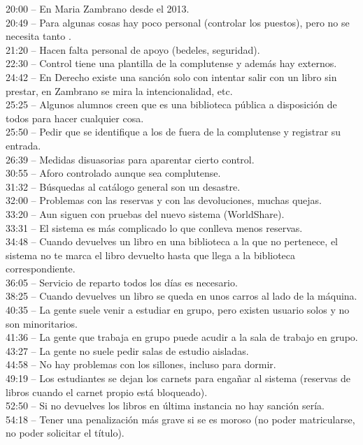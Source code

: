 \documentclass[12pt]{article}
\begin{document}
20:00 – En Maria Zambrano desde el 2013.\\
20:49 – Para algunas cosas hay poco personal (controlar los puestos), pero no se necesita tanto .\\
21:20 – Hacen falta personal de apoyo (bedeles, seguridad).\\
22:30 – Control tiene una plantilla de la complutense y además hay externos.\\
24:42 – En Derecho existe una sanción solo con intentar salir con un libro sin prestar, en Zambrano se mira la intencionalidad, etc.\\
25:25 – Algunos alumnos creen que es una biblioteca pública a disposición de todos para hacer cualquier cosa.\\
25:50 – Pedir que se identifique a los de fuera de la complutense y registrar su entrada.\\
26:39 – Medidas disuasorias para aparentar cierto control.\\
30:55 – Aforo controlado aunque sea complutense.\\
31:32 – Búsquedas al catálogo general son un desastre.\\
32:00 – Problemas con las reservas y con las devoluciones, muchas quejas.\\
33:20 – Aun siguen con pruebas del nuevo sistema (WorldShare).\\
33:31 – El sistema es más complicado lo que conlleva menos reservas.\\
34:48 – Cuando devuelves un libro en una biblioteca a la que no pertenece, el sistema no te marca el libro devuelto hasta que llega a la biblioteca correspondiente.\\
36:05 – Servicio de reparto todos los días es necesario.\\
38:25 – Cuando devuelves un libro se queda en unos carros al lado de la máquina.\\
40:35 – La gente suele venir a estudiar en grupo, pero existen usuario solos y no son minoritarios.\\
41:36 – La gente que trabaja en grupo puede acudir a la sala de trabajo en grupo.\\
43:27 – La gente no suele pedir salas de estudio aisladas.\\
44:58 – No hay problemas con los sillones, incluso para dormir.\\
49:19 – Los estudiantes se dejan los carnets para engañar al sistema (reservas de libros cuando el carnet propio está bloqueado).\\
52:50 – Si no devuelves los libros en última instancia no hay sanción sería.\\
54:18 – Tener una penalización más grave si se es moroso (no poder matricularse, no poder solicitar el título).\\
\end{document}
